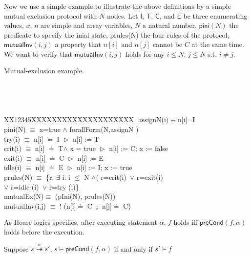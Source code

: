 \documentclass[final]{IEEEtran}
\newlength{\fminilength}
\newenvironment{fmini}[1][\linewidth]
  {\setlength{\fminilength}{#1\fboxsep-2\fboxrule}%
   \vspace{2ex}\noindent\begin{lrbox}{\fminibox}\begin{minipage}{\fminilength}%
   \mbox{ }\hfill\vspace{-2.5ex}}%
  {\end{minipage}\end{lrbox}\vspace{1ex}\hspace{0ex}%
   \framebox{\usebox{\fminibox}}}
\newenvironment{specification}
{\noindent\scriptsize
\tt\begin{fmini}\begin{tabbing}X\=X12345\=XXXX\=XXXX\=XXXX\=XXXX\=XXXX
\=\+\kill} {\end{tabbing}\normalfont\end{fmini}}
\def \eqc {\doteq }
\def \andc {\barwedge }
\def \negc {!}
\begin{document}
Now we use a simple example to illustrate the above definitions by a simple mutual exclusion protocol with $N$ nodes. Let $\mathsf{I}$, $\mathsf{T}$,
 $\mathsf{C}$, and  $\mathsf{E}$  be three enumerating values, $x$,    $n$ are  simple and array variables, $N$ a natural number,  $\mathsf{pini}(N)$   the predicate to specify the inial state, prules(N) the four rules of the protocol, $\mathsf{mutualInv}(i,j)$ a property that $n[i]$ and $ n[j]$ cannot be $C$ at the same time. We want to verify that $\mathsf{mutualInv}(i,j)$ holds for any $i\le N$, $j \le N$ s.t. $i \neq j$.
\vspace{-0.3cm}
\begin{example}\label{example1}Mutual-exclusion example.

\begin{specification}
assignN(i)$\equiv$n[i]=I\\
 pini(N) $\equiv$
   x=true $\wedge$  forallForm(N,assignN )\\

    try(i) $\equiv$ n[i] $\eqc$ I $\vartriangleright$ n[i] := T \\

    crit(i) $\equiv$ n[i] $\eqc$ T$\wedge$ x = true $\vartriangleright$  n[i] := C; x := false\\

%
   exit(i) $\equiv$ n[i] $\eqc$ C $\vartriangleright$ n[i] := E \\


   idle(i) $\equiv$  n[i] $\eqc$ E $\vartriangleright$ n[i] := I;  x := true
  \\%
   prules(N) $\equiv$ \{r. $\exists$ i. i $\le$ N $\wedge$( r=crit(i)~$\vee$ r=exit(i) \\
    $\vee$ r=idle (i)~$\vee$ r=try (i)\}\\

mutualEx(N)$\equiv$ (pIni(N), prules(N))\\

mutualInv(i,j) $\equiv$
  $\negc$ (n[i]$\eqc$ C $\andc$ n[j]$\eqc$ C)\\



\end{specification}
\end{example}


As Hoare logics specifies,  after executing statement $\alpha$, $f$ holds iff $\mathsf{preCond}(f, \alpha)$ holds before the execution.
\begin{lemma}\label{lemma-preCond}
Suppose $s\overset{\alpha}{\twoheadrightarrow } s'$,
$s\models \mathsf{preCond} (f, \alpha)$ if and only if $s'\models f$
\end{lemma}
\end{document}
